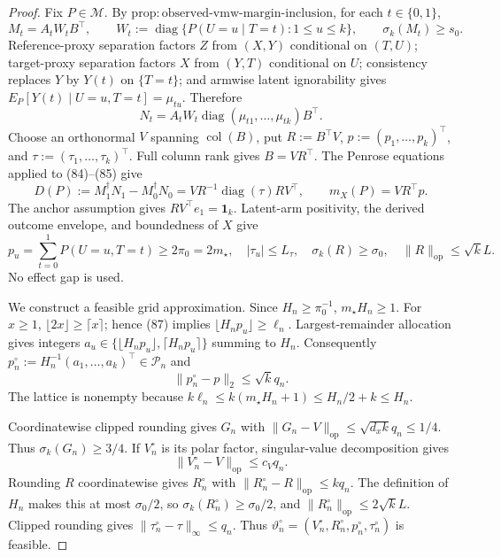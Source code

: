 \documentclass{article}
\begin{document}
\begin{proof}
Fix \(P\in\mathcal M\).  By \(\mathrm{prop:observed\text{-}vmw\text{-}margin\text{-}inclusion}\), for each \(t\in\{0,1\}\),
\[
M_t=A_tW_tB^\top,\qquad
W_t:=\operatorname{diag}\{P(U=u\mid T=t):1\le u\le k\},
\qquad \sigma_k(M_t)\ge s_0.                                      \tag{84}
\]
Reference-proxy separation factors \(Z\) from \((X,Y)\) conditional on \((T,U)\); target-proxy separation factors \(X\) from \((Y,T)\) conditional on \(U\); consistency replaces \(Y\) by \(Y(t)\) on \(\{T=t\}\); and armwise latent ignorability gives \(E_P[Y(t)\mid U=u,T=t]=\mu_{tu}\).  Therefore
\[
N_t=A_tW_t\operatorname{diag}(\mu_{t1},\ldots,\mu_{tk})B^\top.       \tag{85}
\]
Choose an orthonormal \(V\) spanning \(\operatorname{col}(B)\), put \(R:=B^\top V\), \(p:=(p_1,\ldots,p_k)^\top\), and \(\tau:=(\tau_1,\ldots,\tau_k)^\top\).  Full column rank gives \(B=VR^\top\).  The Penrose equations applied to (84)--(85) give
\[
D(P):=M_1^\dagger N_1-M_0^\dagger N_0
=VR^{-1}\operatorname{diag}(\tau)RV^\top,
\qquad m_X(P)=VR^\top p.                                           \tag{86}
\]
The anchor assumption gives \(RV^\top e_1=\mathbf1_k\).  Latent-arm positivity, the derived outcome envelope, and boundedness of \(X\) give
\[
p_u=\sum_{t=0}^1P(U=u,T=t)\ge2\pi_0=2m_\star,
\quad |\tau_u|\le L_{\tau},
\quad \sigma_k(R)\ge\sigma_0,
\quad \lVert R\rVert_{\mathrm{op}}\le\sqrt{k}L.                  \tag{87}
\]
No effect gap is used.

We construct a feasible grid approximation.  Since \(H_n\ge\pi_0^{-1}\), \(m_\star H_n\ge1\).  For \(x\ge1\), \(\lfloor2x\rfloor\ge\lceil x\rceil\); hence (87) implies \(\lfloor H_np_u\rfloor\ge\ell_n\).  Largest-remainder allocation gives integers \(a_u\in\{\lfloor H_np_u\rfloor,\lceil H_np_u\rceil\}\) summing to \(H_n\).  Consequently \(p_n^\circ:=H_n^{-1}(a_1,\ldots,a_k)^\top\in\mathcal P_n\) and
\[
\lVert p_n^\circ-p\rVert_2\le\sqrt{k}q_n.                           \tag{88}
\]
The lattice is nonempty because
\(k\ell_n\le k(m_\star H_n+1)\le H_n/2+k\le H_n\).

Coordinatewise clipped rounding gives \(G_n\) with \(\lVert G_n-V\rVert_{\mathrm{op}}\le\sqrt{d_xk}q_n\le1/4\).  Thus \(\sigma_k(G_n)\ge3/4\).  If \(V_n^\circ\) is its polar factor, singular-value decomposition gives
\[
\lVert V_n^\circ-V\rVert_{\mathrm{op}}\le c_Vq_n.                  \tag{89}
\]
Rounding \(R\) coordinatewise gives \(R_n^\circ\) with \(\lVert R_n^\circ-R\rVert_{\mathrm{op}}\le kq_n\).  The definition of \(H_n\) makes this at most \(\sigma_0/2\), so \(\sigma_k(R_n^\circ)\ge\sigma_0/2\), and \(\lVert R_n^\circ\rVert_{\mathrm{op}}\le2\sqrt{k}L\).  Clipped rounding gives \(\lVert\tau_n^\circ-\tau\rVert_\infty\le q_n\).  Thus \(\vartheta_n^\circ=(V_n^\circ,R_n^\circ,p_n^\circ,\tau_n^\circ)\) is feasible.


\end{proof}
\end{document}
